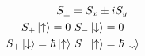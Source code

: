 

\vspace*{\fill}
\centering

\begin{align*}
    S_{\pm} &= S_{x} \pm i S_{y} \\
    S_{+}\ket{\uparrow} = 0 &~ S_{-}\ket{\downarrow} = 0 \\
    S_{+}\ket{\downarrow} = \hbar\ket{\uparrow} &~ S_{-}\ket{\uparrow} = \hbar\ket{\downarrow}
\end{align*}

\centering
\vspace*{\fill}

